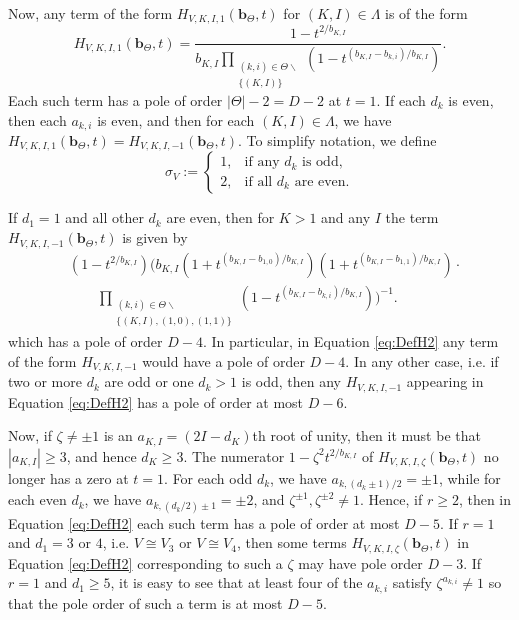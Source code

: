 \documentclass{amsart}
\theoremstyle{definition}
\theoremstyle{remark}
\newcommand{\bs}{\boldsymbol}
\begin{document}
Now, any term of the form $H_{V,K,I,1}(\bs{b}_\Theta, t)$ for $(K,I)\in\Lambda$ is of the form
\begin{equation}
\label{eq:TermZ1}
    H_{V,K,I,1}(\bs{b}_\Theta, t) =
    \frac{ 1 - t^{2/b_{K,I}}}
    {b_{K,I} \prod\limits_{\substack{(k,i)\in\Theta\smallsetminus \\ \{(K,I)\}}}
            (1 - t^{(b_{K,I} - b_{k,i})/b_{K,I}})}.
\end{equation}
Each such term has a pole of order $|\Theta|-2=D - 2$ at $t = 1$. If each $d_k$ is even, then each
$a_{k,i}$ is even, and then for each $(K,I)\in\Lambda$, we have
$H_{V,K,I,1}(\bs{b}_\Theta, t) = H_{V,K,I,-1}(\bs{b}_\Theta, t)$. To simplify notation, we define
\begin{equation}
\label{eq:DefPV}
    \sigma_V :=
    \begin{cases}
        1,  &   \mbox{if any $d_k$ is odd,}         \\
        2,  &   \mbox{if all $d_k$ are even.}
    \end{cases}
\end{equation}


If $d_1 = 1$ and all other $d_k$ are even, then for $K > 1$ and any $I$
the term $H_{V,K,I,-1}(\bs{b}_\Theta, t)$ is given by
\begin{align}
\label{eq:Case2TermNot1}
    &
    (1 - t^{2/b_{K,I}})
        \Big(b_{K,I} (1 + t^{(b_{K,I}-b_{1,0})/b_{K,I}})
            (1 + t^{(b_{K,I}-b_{1,1})/b_{K,I}}) \cdot
    \\ \nonumber &\quad\quad
            \prod\limits_{\substack{(k,i)\in\Theta\smallsetminus \\ \{(K,I),(1,0),(1,1)\} }}
                (1 - t^{(b_{K,I}-b_{k,i})/b_{K,I}}) \Big)^{-1}.
\end{align}
which has a pole of order $D - 4$. In particular, in Equation \eqref{eq:DefH2}
any term of the form $H_{V,K,I,-1}$ would have a pole of order $D - 4$.
In any other case, i.e. if two or more $d_k$ are odd or one $d_k > 1$ is odd,
then any $H_{V,K,I,-1}$ appearing in Equation \eqref{eq:DefH2} has a pole
of order at most $D - 6$.

Now, if $\zeta\neq\pm 1$ is an $a_{K,I} = (2I - d_K)$th root of unity, then it must be that
$|a_{K,I}| \geq 3$, and hence $d_K \geq 3$. The numerator $1 - \zeta^2 t^{2/b_{K,I}}$ of
$H_{V,K,I,\zeta}(\bs{b}_\Theta,t)$ no longer has a zero at $t = 1$. For each odd $d_k$, we have
$a_{k,(d_k\pm 1)/2} = \pm 1$,
while for each even $d_k$, we have $a_{k,(d_k/2) \pm 1} = \pm 2$, and
$\zeta^{\pm 1}, \zeta^{\pm 2} \neq 1$. Hence, if $r \geq 2$, then in Equation \eqref{eq:DefH2}
each such term has a pole of
order at most $D - 5$. If $r = 1$ and $d_1 = 3$ or $4$, i.e. $V \cong V_3$ or $V \cong V_4$,
then some terms $H_{V,K,I,\zeta}(\bs{b}_\Theta, t)$ in Equation \eqref{eq:DefH2} corresponding to
such a $\zeta$ may have pole order $D-3$. If $r = 1$ and $d_1 \ge 5$,
it is easy to see that at least four of the $a_{k,i}$ satisfy $\zeta^{a_{k,i}} \neq 1$ so that the
pole order of such a term is at most $D - 5$.
\end{document}
